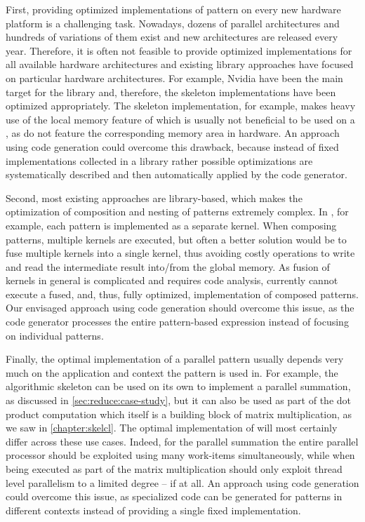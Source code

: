First, providing optimized implementations of pattern on every new hardware platform is a challenging task.
Nowadays, dozens of parallel architectures and hundreds of variations of them exist and new architectures are released every year.
Therefore, it is often not feasible to provide optimized implementations for all available hardware architectures and existing library approaches have focused on particular hardware architectures.
For example, Nvidia \GPUs have been the main target for the \SkelCL library and, therefore, the skeleton implementations have been optimized appropriately.
The \stencil skeleton implementation, for example, makes heavy use of the local memory feature of \OpenCL which is usually not beneficial to be used on a \CPU, as \CPUs do not feature the corresponding memory area in hardware.
An approach using code generation could overcome this drawback, because instead of fixed implementations collected in a library rather possible optimizations are systematically described and then automatically applied by the code generator.

\bigskip

Second, most existing approaches are library-based, which makes the optimization of composition and nesting of patterns extremely complex.
In \SkelCL, for example, each pattern is implemented as a separate \OpenCL kernel.
When composing patterns, multiple kernels are executed, but often a better solution would be to fuse multiple kernels into a single kernel, thus avoiding costly operations to write and read the intermediate result into/from the global memory.
As fusion of \OpenCL kernels in general is complicated and requires code analysis, \SkelCL currently cannot execute a fused, and, thus, fully optimized, implementation of composed patterns.
Our envisaged approach using code generation should overcome this issue, as the code generator processes the entire pattern-based expression instead of focusing on individual patterns.

\bigskip

Finally, the optimal implementation of a parallel pattern usually depends very much on the application and context the pattern is used in.
For example, the algorithmic skeleton \reduce can be used on its own to implement a parallel summation, as discussed in \autoref{sec:reduce:case-study}, but it can also be used as part of the dot product computation which itself is a building block of matrix multiplication, as we saw in \autoref{chapter:skelcl}.
The optimal implementation of \reduce will most certainly differ across these use cases.
Indeed, for the parallel summation the entire parallel processor should be exploited using many \OpenCL work-items simultaneously, while when being executed as part of the matrix multiplication \reduce should only exploit thread level parallelism to a limited degree -- if at all.
An approach using code generation could overcome this issue, as specialized code can be generated for patterns in different contexts instead of providing a single fixed implementation.

